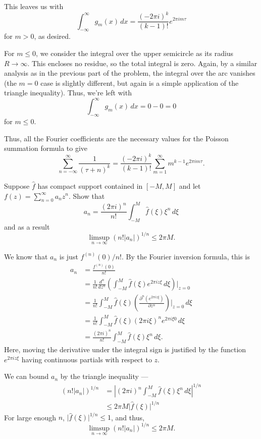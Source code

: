 \documentclass[12 pt, letterpaper]{hmcpset}
\begin{document}
\begin{solution}
	This leaves us with
	\[
		\int_{-\infty}^{\infty} g_{m}(x) \, dx = \frac{(-2 \pi i)^{k}}{(k - 1)!} e^{2 \pi i m \tau}
	\]
	for $m > 0$, as desired.

	For $m \le 0$, we consider the integral over the upper semicircle as its radius $R \to \infty$. This encloses no residue, so the total integral is zero. Again, by a similar analysis as in the previous part of the problem, the integral over the arc vanishes (the $m  = 0$ case is slightly different, but again is a simple application of the triangle inequality). Thus, we're left with
	\[
		\int_{-\infty}^{\infty} g_{m}(x) \, dx = 0 - 0 = 0
	\]
	for $m \le 0$.

	Thus, all the Fourier coefficients are the necessary values for the Poisson summation formula to give
	\[
		\sum_{n = -\infty}^{\infty} \frac{1}{(\tau + n)^{k}} = \frac{(-2 \pi i)^{k}}{(k - 1)!} \sum_{m = 1}^{\infty} m^{k - 1} e^{2 \pi i m \tau}.
	\]
\end{solution}

\pagebreak

\begin{problem}[8.]
	Suppose $\hat{f}$ has compact support contained in $[-M, M]$ and let $f(z) = \sum_{n = 0}^{\infty} a_{n} z^{n}$. Show that
	\[
		a_{n} = \frac{(2 \pi i)^{n}}{n!} \int_{-M}^{M} \hat{f}(\xi) \xi^{n} \, d\xi
	\]
	and as a result
	\[
		\limsup_{n \to \infty} (n! \lvert a_{n} \rvert)^{1/n} \le 2 \pi M.
	\]
\end{problem}

\begin{solution}
	We know that $a_{n}$ is just $f^{(n)}(0) / n!$. By the Fourier inversion formula, this is
	\[
		\begin{split}
			a_{n} & = \frac{f^{(n)}(0)}{n!} \\
			      & = \frac{1}{n!} \frac{d^{n}}{dz^{n}} \left ( \int_{-M}^{M} \hat{f}(\xi) e^{2 \pi i z \xi} \, d\xi \right ) \Big |_{z = 0} \\
			      & = \frac{1}{n!} \int_{-M}^{M} \hat{f}(\xi) \left ( \frac{\partial^{n}(e^{2 \pi i z \xi})}{\partial z^{n}} \right ) \Big |_{z = 0} \, d\xi \\
			      & = \frac{1}{n!} \int_{-M}^{M} \hat{f}(\xi) (2 \pi i \xi)^{n} e^{2 \pi i \xi 0} \, d\xi \\
			      & = \frac{(2 \pi i)^{n}}{n!} \int_{-M}^{M} \hat{f}(\xi) \xi^{n} \, d\xi.
		\end{split}
	\]
	Here, moving the derivative under the integral sign is justified by the function $e^{2 \pi i z \xi}$ having continuous partials with respect to $z$.
	
	We can bound $a_{n}$ by the triangle inequality ---
	\[
		\begin{split}
			(n! \lvert a_{n} \rvert)^{1/n} & = \left \lvert (2 \pi i)^{n} \int_{-M}^{M} \hat{f}(\xi) \xi^{n} \, d\xi  \right \rvert^{1/n} \\
						       & \le 2 \pi M \lvert \hat{f}(\xi) \rvert^{1/n}
		\end{split}
	\]
	For large enough $n$, $\lvert \hat{f}(\xi) \rvert^{1/n} \le 1$, and thus,
	\[
		\limsup_{n \to \infty} (n! \lvert a_{n} \rvert)^{1/n} \le 2 \pi M.
	\]
\end{solution}
\end{document}
